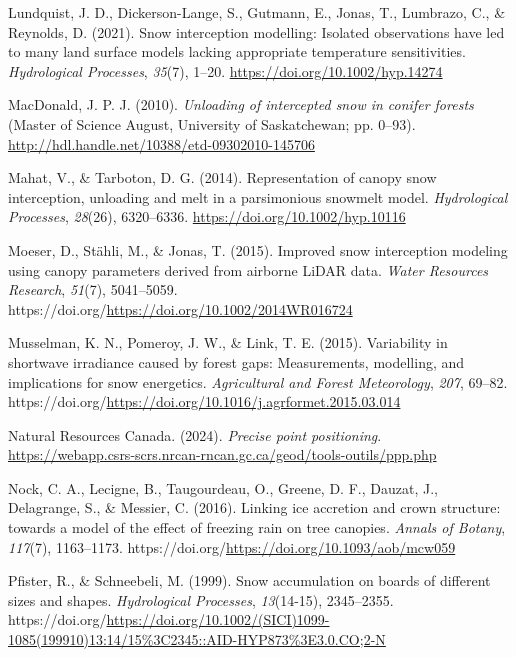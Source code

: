 \documentclass[
  letterpaper,
  DIV=11,
  numbers=noendperiod]{scrartcl}
\newlength{\cslhangindent}
\newenvironment{CSLReferences}[2] %
 {\begin{list}{}{%
  \setlength{\itemindent}{0pt}
  \setlength{\leftmargin}{0pt}
  \setlength{\parsep}{0pt}
  \ifodd #1
   \setlength{\leftmargin}{\cslhangindent}
   \setlength{\itemindent}{-1\cslhangindent}
  \fi
  \setlength{\itemsep}{#2\baselineskip}}}
 {\end{list}}
\begin{document}
\begin{CSLReferences}{1}{0}
Lundquist, J. D., Dickerson-Lange, S., Gutmann, E., Jonas, T., Lumbrazo,
C., \& Reynolds, D. (2021). {Snow interception modelling: Isolated
observations have led to many land surface models lacking appropriate
temperature sensitivities}. \emph{Hydrological Processes}, \emph{35}(7),
1--20. \url{https://doi.org/10.1002/hyp.14274}

MacDonald, J. P. J. (2010). \emph{{Unloading of intercepted snow in
conifer forests}} (Master of Science August, University of Saskatchewan;
pp. 0--93). \url{http://hdl.handle.net/10388/etd-09302010-145706}

Mahat, V., \& Tarboton, D. G. (2014). {Representation of canopy snow
interception, unloading and melt in a parsimonious snowmelt model}.
\emph{Hydrological Processes}, \emph{28}(26), 6320--6336.
\url{https://doi.org/10.1002/hyp.10116}

Moeser, D., Stähli, M., \& Jonas, T. (2015). {Improved snow interception
modeling using canopy parameters derived from airborne LiDAR data}.
\emph{Water Resources Research}, \emph{51}(7), 5041--5059.
https://doi.org/\url{https://doi.org/10.1002/2014WR016724}

Musselman, K. N., Pomeroy, J. W., \& Link, T. E. (2015). {Variability in
shortwave irradiance caused by forest gaps: Measurements, modelling, and
implications for snow energetics}. \emph{Agricultural and Forest
Meteorology}, \emph{207}, 69--82.
https://doi.org/\url{https://doi.org/10.1016/j.agrformet.2015.03.014}

Natural Resources Canada. (2024). \emph{{Precise point positioning}}.
\url{https://webapp.csrs-scrs.nrcan-rncan.gc.ca/geod/tools-outils/ppp.php}

Nock, C. A., Lecigne, B., Taugourdeau, O., Greene, D. F., Dauzat, J.,
Delagrange, S., \& Messier, C. (2016). {Linking ice accretion and crown
structure: towards a model of the effect of freezing rain on tree
canopies}. \emph{Annals of Botany}, \emph{117}(7), 1163--1173.
https://doi.org/\url{https://doi.org/10.1093/aob/mcw059}

Pfister, R., \& Schneebeli, M. (1999). {Snow accumulation on boards of
different sizes and shapes}. \emph{Hydrological Processes},
\emph{13}(14-15), 2345--2355.
https://doi.org/\url{https://doi.org/10.1002/(SICI)1099-1085(199910)13:14/15\%3C2345::AID-HYP873\%3E3.0.CO;2-N}


\end{CSLReferences}
\end{document}
